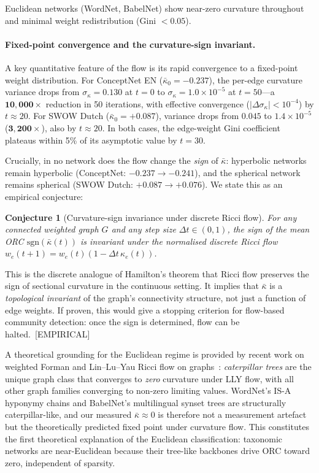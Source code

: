 \documentclass[11pt,a4paper]{article}
\newcommand{\kbar}{\bar{\kappa}}
\begin{document}
Euclidean networks (WordNet, BabelNet) show near-zero curvature
throughout and minimal weight redistribution (Gini $<0.05$).

\paragraph{Fixed-point convergence and the curvature-sign invariant.}
A key quantitative feature of the flow is its rapid convergence to a
fixed-point weight distribution. For ConceptNet EN ($\kbar_0 = -0.237$),
the per-edge curvature variance drops from $\sigma_\kappa = 0.130$ at
$t=0$ to $\sigma_\kappa = 1.0 \times 10^{-5}$ at $t=50$---a
$\mathbf{10{,}000\times}$ reduction in 50 iterations, with
effective convergence ($|\Delta\sigma_\kappa| < 10^{-4}$) by $t \approx 20$.
For SWOW Dutch ($\kbar_0 = +0.087$), variance drops from $0.045$ to
$1.4 \times 10^{-5}$ ($\mathbf{3{,}200\times}$), also by $t \approx 20$.
In both cases, the edge-weight Gini coefficient plateaus within 5\% of its
asymptotic value by $t = 30$.

Crucially, in no network does the flow change the \emph{sign} of
$\kbar$: hyperbolic networks remain hyperbolic (ConceptNet: $-0.237
\to -0.241$), and the spherical network remains spherical (SWOW Dutch:
$+0.087 \to +0.076$). We state this as an empirical conjecture:

\medskip
\noindent\textbf{Conjecture 1} (Curvature-sign invariance under discrete Ricci flow).
\emph{For any connected weighted graph $G$ and any step size $\Delta t \in
(0, 1)$, the sign of the mean ORC $\mathrm{sgn}(\bar\kappa(t))$ is
invariant under the normalised discrete Ricci flow
$w_e(t+1) = w_e(t)(1 - \Delta t\,\kappa_e(t))$.}
\medskip

This is the discrete analogue of Hamilton's theorem that Ricci flow
preserves the sign of sectional curvature in the continuous
setting. It implies that $\bar\kappa$ is a \emph{topological
invariant} of the graph's connectivity structure, not just a
function of edge weights. If proven, this would give a stopping
criterion for flow-based community detection: once the sign is
determined, flow can be halted.~[EMPIRICAL]

A theoretical grounding for the Euclidean regime is provided by recent
work on weighted Forman and Lin--Lu--Yau Ricci flow on
graphs~\cite{munch2026weighted}: \emph{caterpillar trees} are the
unique graph class that converges to \emph{zero} curvature under LLY
flow, with all other graph families converging to non-zero limiting
values.  WordNet's IS-A hyponymy chains and BabelNet's multilingual
synset trees are structurally caterpillar-like, and our measured
$\kbar \approx 0$ is therefore not a measurement artefact but the
theoretically predicted fixed point under curvature flow.  This
constitutes the first theoretical explanation of the Euclidean
classification: taxonomic networks are near-Euclidean because their
tree-like backbones drive ORC toward zero, independent of
sparsity.
\end{document}

